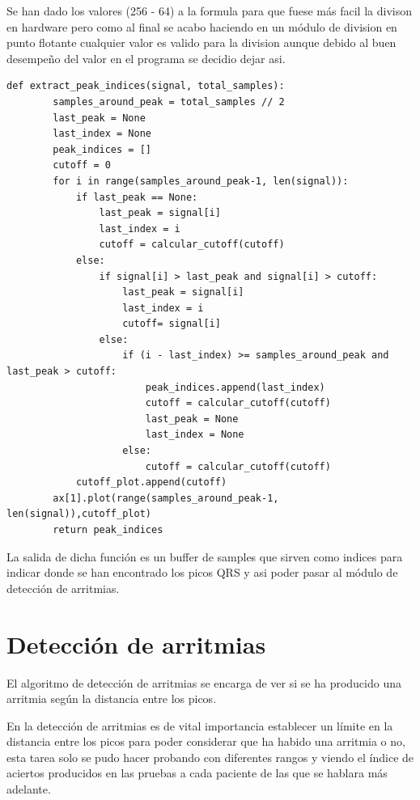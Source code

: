 Se han dado los valores (256 - 64) a la formula para que fuese más facil la divison en hardware pero como al final 
se acabo haciendo en un módulo de division en punto flotante cualquier valor es valido para la division aunque debido 
al buen desempeño del valor en el programa se decidio dejar asi.

\lstset{language=python, breaklines=true, basicstyle=\footnotesize}
\begin{lstlisting}[frame=single]
    def extract_peak_indices(signal, total_samples):
        samples_around_peak = total_samples // 2
        last_peak = None
        last_index = None
        peak_indices = []
        cutoff = 0
        for i in range(samples_around_peak-1, len(signal)):
            if last_peak == None:
                last_peak = signal[i]
                last_index = i
                cutoff = calcular_cutoff(cutoff)
            else:
                if signal[i] > last_peak and signal[i] > cutoff:
                    last_peak = signal[i]
                    last_index = i
                    cutoff= signal[i]
                else:
                    if (i - last_index) >= samples_around_peak and last_peak > cutoff:
                        peak_indices.append(last_index)
                        cutoff = calcular_cutoff(cutoff)
                        last_peak = None
                        last_index = None         
                    else:
                        cutoff = calcular_cutoff(cutoff)
            cutoff_plot.append(cutoff)
        ax[1].plot(range(samples_around_peak-1, len(signal)),cutoff_plot)
        return peak_indices
\end{lstlisting}

La salida de dicha función es un buffer de samples que sirven como indices para indicar donde se han encontrado
los picos QRS y asi poder pasar al módulo de detección de arritmias.

\section{Detección de arritmias}

El algoritmo de detección de arritmias se encarga de ver si se ha producido una arritmia según la
distancia entre los picos.

En la detección de arritmias es de vital importancia establecer un límite en la distancia entre los picos
para poder considerar que ha habido una arritmia o no, esta tarea solo se pudo hacer probando con diferentes
rangos y viendo el índice de aciertos producidos en las pruebas a cada paciente de las que se hablara más adelante. 


